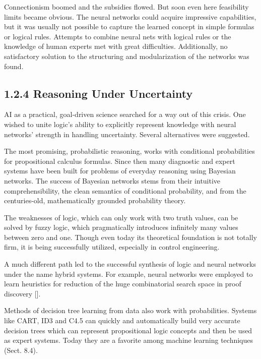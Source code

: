 \documentclass[10pt]{article}
\begin{document}
Connectionism boomed and the subsidies flowed. But soon even here feasibility limits became obvious. The neural networks could acquire impressive capabilities, but it was usually not possible to capture the learned concept in simple formulas or logical rules. Attempts to combine neural nets with logical rules or the knowledge of human experts met with great difficulties. Additionally, no satisfactory solution to the structuring and modularization of the networks was found.

\subsection*{1.2.4 Reasoning Under Uncertainty}
AI as a practical, goal-driven science searched for a way out of this crisis. One wished to unite logic's ability to explicitly represent knowledge with neural networks' strength in handling uncertainty. Several alternatives were suggested.

The most promising, probabilistic reasoning, works with conditional probabilities for propositional calculus formulas. Since then many diagnostic and expert systems have been built for problems of everyday reasoning using Bayesian\\
networks. The success of Bayesian networks stems from their intuitive comprehensibility, the clean semantics of conditional probability, and from the centuries-old, mathematically grounded probability theory.


The weaknesses of logic, which can only work with two truth values, can be solved by fuzzy logic, which pragmatically introduces infinitely many values between zero and one. Though even today its theoretical foundation is not totally firm, it is being successfully utilized, especially in control engineering.

A much different path led to the successful synthesis of logic and neural networks under the name hybrid systems. For example, neural networks were employed to learn heuristics for reduction of the huge combinatorial search space in proof discovery [\cite{suttner1990automatic}].

Methods of decision tree learning from data also work with probabilities. Systems like CART, ID3 and C4.5 can quickly and automatically build very accurate decision trees which can represent propositional logic concepts and then be used as expert systems. Today they are a favorite among machine learning techniques (Sect. 8.4).
\end{document}
